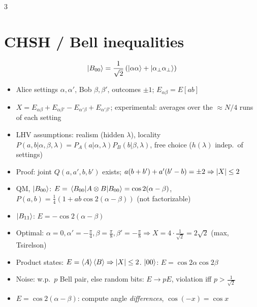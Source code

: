\documentclass[10pt]{article}
\newcommand{\B}[1]{\ket{B_{#1}}}
\begin{document}
\begin{multicols*}{3}
\section{CHSH / Bell inequalities}
\begin{align*} 
	\ket{B_{00}} = \frac{1}{\sqrt{2}}\left(\ket{\alpha \alpha} + \ket{\alpha_\perp \alpha_\perp} \right) 
\end{align*}
\begin{itemize}
  \item Alice settings $\alpha,\alpha'$, Bob $\beta,\beta'$, outcomes $\pm1$; $E_{\alpha\beta}=E[ab]$
  \item $X=E_{\alpha\beta}+E_{\alpha\beta'}-E_{\alpha'\beta}+E_{\alpha'\beta'}$; experimental: averages over the $\approx N/4$ runs of each setting
  \item LHV assumptions: realism (hidden $\lambda$), locality $P(a,b|\alpha,\beta,\lambda)=P_A(a|\alpha,\lambda)P_B(b|\beta,\lambda)$, free choice ($h(\lambda)$ indep.\ of settings)
  \item Proof: joint $Q(a,a',b,b')$ exists; $a(b+b')+a'(b'-b)=\pm2\Rightarrow\abs{X}\le2$
  \item QM, $\B{00}$: $E=\mel{B_{00}}{A\otimes B}{B_{00}}=\cos2(\alpha-\beta)$, $P(a,b)=\tfrac14(1+ab\cos2(\alpha-\beta))$ (not factorizable)
  \item $\B{11}$: $E=-\cos2(\alpha-\beta)$
  \item Optimal: $\alpha=0,\alpha'=-\tfrac\pi4,\beta=\tfrac\pi8,\beta'=-\tfrac\pi8\Rightarrow X=4\cdot\tfrac1{\sqrt2}=2\sqrt2$ (max, Tsirelson)
  \item Product states: $E=\ev{A}\ev{B}\Rightarrow\abs{X}\le2$. $\ket{00}$: $E=\cos2\alpha\cos2\beta$
  \item Noise: w.p.\ $p$ Bell pair, else random bits: $E\to pE$, violation iff $p>\tfrac1{\sqrt2}$
  \item $E=\cos2(\alpha-\beta)$: compute angle \emph{differences}, $\cos(-x)=\cos x$
\end{itemize}


\end{multicols*}
\end{document}
